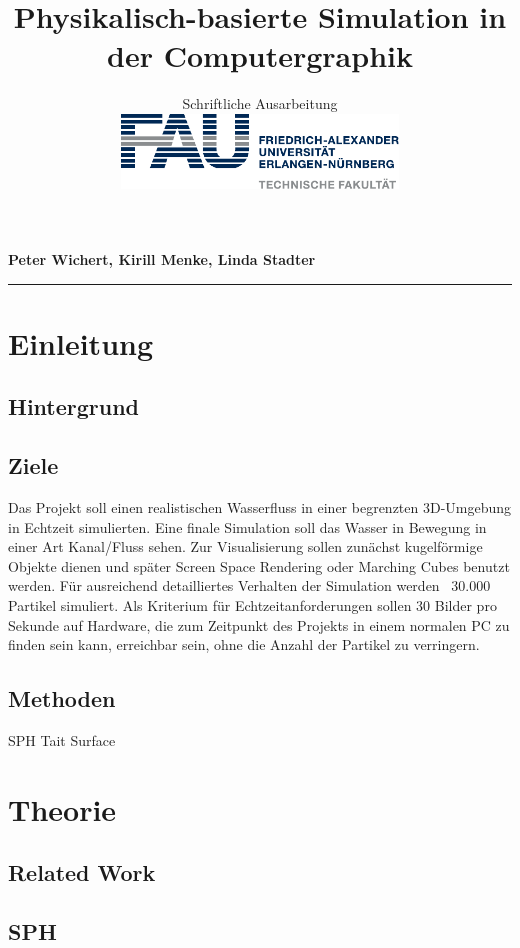 \documentclass[a4paper]{paper}
\title{Physikalisch-basierte Simulation in der Computergraphik}
\subtitle{Schriftliche Ausarbeitung\\
\hfill\includegraphics[height=2cm]{fau-logo-tech.pdf}
\vspace{-2cm}}
\author{\ProjectTitle}
\newcommand{\StudentNames}{Peter Wichert, Kirill Menke, Linda Stadter}
\begin{document}
 
\maketitle 
\textbf{\StudentNames} \\
\hrule\bigskip



\section{Einleitung} 
\subsection{Hintergrund}



\subsection{Ziele}
Das Projekt soll einen realistischen Wasserfluss in einer begrenzten 3D-Umgebung in Echtzeit simulierten. %
Eine finale Simulation soll das Wasser in Bewegung in einer Art Kanal/Fluss sehen.
Zur Visualisierung sollen zunächst kugelförmige Objekte dienen und später Screen Space Rendering oder Marching Cubes benutzt werden. 
 Für ausreichend detailliertes Verhalten der Simulation werden ~30.000 Partikel simuliert. Als Kriterium für Echtzeitanforderungen sollen 30 Bilder pro Sekunde auf Hardware, die zum Zeitpunkt des Projekts in einem normalen PC zu finden sein kann, erreichbar sein, ohne die Anzahl der Partikel zu verringern. 
\subsection{Methoden}
SPH
Tait
Surface


\section{Theorie}
\subsection{Related Work}%
\subsection{SPH}
\end{document}
